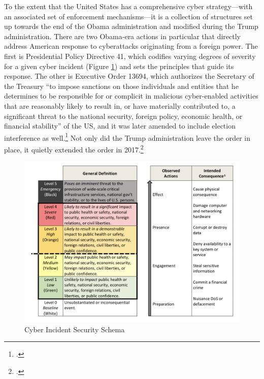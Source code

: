 \documentclass{memoir}
\begin{document}
\begin{refsegment}
To the extent that the United States has a comprehensive cyber strategy---with an associated set of enforcement mechanisms---it is a collection of structures set up towards the end of the Obama administration and modified during the Trump administration. There are two Obama-era actions in particular that directly address American response to cyberattacks originating from a foreign power. The first is Presidential Policy Directive 41, which codifies varying degrees of severity for a given cyber incident (Figure \ref{severity-schema}) and sets the principles that guide its response. The other is Executive Order 13694, which authorizes the Secretary of the Treasury ``to impose sanctions on those individuals and entities that he determines to be responsible for or complicit in malicious cyber-enabled activities that are reasonably likely to result in, or have materially contributed to, a significant threat to the national security, foreign policy, economic health, or financial stability'' of the US, and it was later amended to include election interference as well.\footcite{daniel_our_2015} Not only did the Trump administration leave the order in place, it quietly extended the order in 2017.\footcite{uchill_white_2017}

\begin{figure}
\centering
\includegraphics[scale=0.53]{severity-schema.png}
\caption{Cyber Incident Security Schema}
\label{severity-schema}
\end{figure}


\end{refsegment}
\end{document}

